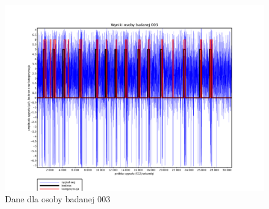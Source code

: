 \documentclass{article}
\begin{document}
        \begin{figure}
            \hspace*{-4.5cm} 
            \vspace*{1.5cm} 
            \includegraphics[width=\linewidth+10cm]{../plotting_data/scilab_eeg_01_sub_003.pdf}
            \caption{Dane dla osoby badanej 003}
        \end{figure}



\end{document}
